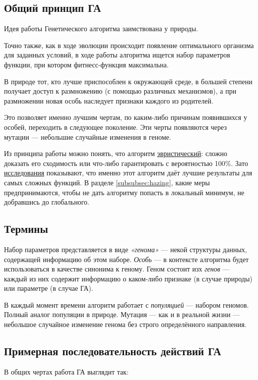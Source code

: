 \subsection{Общий принцип ГА}\label{subsec:ga_general_principles}
Идея работы Генетического алгоритма заимствована у природы.

Точно также, как в ходе эволюции происходит появление оптимального организма для заданных условий,
в ходе работы алгоритма ищется набор параметров функции, при котором фитнесс-функция максимальна.

В природе тот, кто лучше приспособлен к окружающей среде, в большей степени получает доступ к размножению (с помощью различных механизмов),
а при размножении новая особь наследует признаки каждого из родителей.

Это позволяет именно лучшим чертам, по каким-либо причинам появившихся у особей, переходить в следующее поколение.
Эти черты появляются через мутации — небольшие случайные изменения в геноме.

Из принципа работы можно понять, что алгоритм \href{https://en.wikipedia.org/wiki/Heuristic_(computer_science)}{эвристический}: сложно доказать его сходимость или что-либо гарантировать с вероятностью 100\%.
Зато \href{talgat.org/news/wp-content/uploads/2018/08/112.pdf}{исследования} показывают, что именно этот алгоритм даёт лучшие результаты для самых сложных функций.
В разделе \ref{subsubsec:hazing}, какие меры предпринимаются, чтобы не дать алгоритму попасть в локальный минимум, не добравшись до глобального.

\subsection{Термины}\label{subsec:ga_principles}
Набор параметров представляется в виде \textit{«генома»} — некой структуры данных, содержащей информацию об этом наборе.
\textit{Особь} — в контексте алгоритма будет использоваться в качестве синонима к геному.
Геном состоит изх \textit{генов} — каждый из них содержит информацию о каком-либо признаке (в случае природы) или параметре (в случае ГА).

В каждый момент времени алгоритм работает с \textit{популяцией} — набором геномов.
Полный аналог популяции в природе.
Мутация — как и в реальной жизни — небольшое случайное изменение генома без строго определённого направления.

\subsection{Примерная последовательность действий ГА}\label{subsec:approx_ga_algo}
В общих чертах работа ГА выглядит так:

